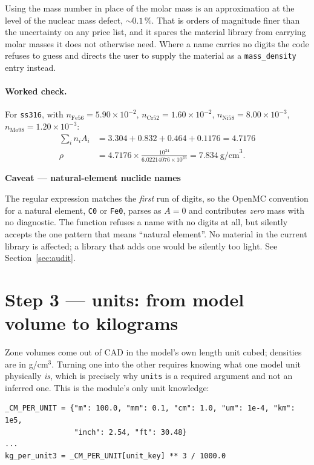 \documentclass[9pt,a4paper]{extarticle}
\newcommand{\code}[1]{\texttt{\small #1}}
\newenvironment{caveat}[1]%
  {\par\medskip\noindent
   \begin{lrbox}{\caveatbox}%
   \begin{minipage}{\dimexpr\linewidth-2\fboxsep-2\fboxrule\relax}%
   \textbf{#1}\par\medskip}%
  {\end{minipage}%
   \end{lrbox}%
   \fcolorbox{warnrule}{warnbg}{\usebox{\caveatbox}}\par\medskip}
\begin{document}
Using the mass number in place of the molar mass is an approximation at the
level of the nuclear mass defect, $\sim 0.1\,\%$. That is orders of magnitude
finer than the uncertainty on any price list, and it spares the material library
from carrying molar masses it does not otherwise need. Where a name carries no
digits the code refuses to guess and directs the user to supply the material as
a \code{mass\_density} entry instead.

\paragraph{Worked check.} For \code{ss316}, with
$n_{\mathrm{Fe56}}=5.90\times10^{-2}$, $n_{\mathrm{Cr52}}=1.60\times10^{-2}$,
$n_{\mathrm{Ni58}}=8.00\times10^{-3}$, $n_{\mathrm{Mo98}}=1.20\times10^{-3}$:
\begin{align*}
  \sum_i n_i A_i &= 3.304 + 0.832 + 0.464 + 0.1176 = 4.7176 \\
  \rho &= 4.7176 \times \frac{10^{24}}{6.02214076\times10^{23}}
        = 7.834\ \text{g/cm}^3 .
\end{align*}

\begin{caveat}{Caveat --- natural-element nuclide names}
The regular expression matches the \emph{first} run of digits, so the OpenMC
convention for a natural element, \code{C0} or \code{Fe0}, parses as $A = 0$ and
contributes \emph{zero} mass with no diagnostic. The function refuses a name with
no digits at all, but silently accepts the one pattern that means ``natural
element''. No material in the current library is affected; a library that adds
one would be silently too light. See Section~\ref{sec:audit}.
\end{caveat}

\section{Step 3 --- units: from model volume to kilograms}

Zone volumes come out of CAD in the model's own length unit cubed; densities are
in g/cm$^3$. Turning one into the other requires knowing what one model unit
physically \emph{is}, which is precisely why \code{units} is a required
argument and not an inferred one. This is the module's only unit knowledge:

\begin{lstlisting}[style=py]
_CM_PER_UNIT = {"m": 100.0, "mm": 0.1, "cm": 1.0, "um": 1e-4, "km": 1e5,
                "inch": 2.54, "ft": 30.48}
...
kg_per_unit3 = _CM_PER_UNIT[unit_key] ** 3 / 1000.0
\end{lstlisting}
\end{document}

